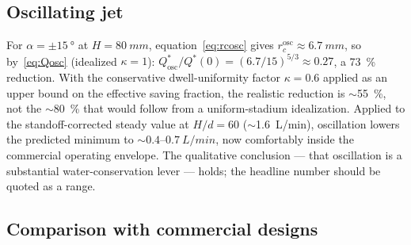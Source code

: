 \documentclass[aps,prfluids,reprint,amsmath,amssymb,floatfix]{revtex4-2}
\begin{document}
\subsection{Oscillating jet}

For $\alpha = \pm\SI{15}{\degree}$ at $H = \SI{80}{mm}$,
equation~\eqref{eq:rcosc} gives $r_c^\mathrm{osc} \approx \SI{6.7}{mm}$,
so by~\eqref{eq:Qosc} (idealized $\kappa = 1$):
$Q^*_\mathrm{osc}/Q^*(0) = (6.7/15)^{5/3} \approx 0.27$, a
\SI{73}{\percent} reduction. With the conservative dwell-uniformity
factor $\kappa = 0.6$ applied as an upper bound on the effective
saving fraction, the realistic reduction is $\sim$\SI{55}{\percent},
not the $\sim$\SI{80}{\percent} that would follow from a uniform-stadium
idealization. Applied to the standoff-corrected steady value at $H/d = 60$
($\sim$\SI{1.6}{L/min}), oscillation lowers the predicted minimum to
$\sim 0.4$--$\SI{0.7}{L/min}$, now comfortably inside the commercial
operating envelope. The qualitative conclusion --- that oscillation is
a substantial water-conservation lever --- holds; the headline number
should be quoted as a range.

\subsection{Comparison with commercial designs}

\begin{table}[h]
\centering
\caption{Theoretical optima vs.\ commercial bidet specifications.
Supply pressure $\Delta P = \SI{0.07}{MPa}$. ``Realistic'' includes
the $H/d = 60$ standoff penalty for the steady case.}
\label{tab:commercial}
\end{table}
\end{document}
